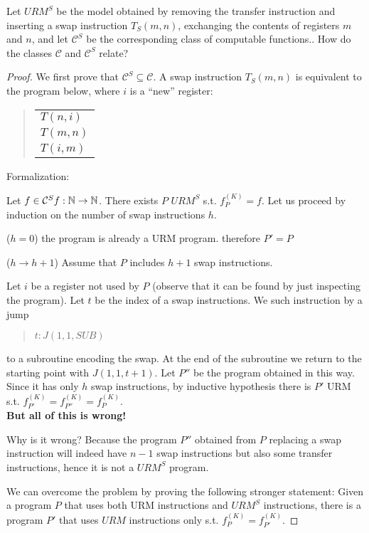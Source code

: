 \begin{exercise}
  Let $URM^S $ be the model obtained by removing the transfer
  instruction and inserting a swap instruction $ T_S(m,n) $,
  exchanging the contents of registers $m$ and $n$, and let $\mathcal{C}^S$ be the corresponding class of computable functions.. How do the classes $\mathcal{C}$ and $\mathcal{C}^S$ relate?

\begin{proof}
  We first prove that $\mathcal{C}^S \subseteq \mathcal{C}$. A swap instruction $T_S (m, n)$ is equivalent to the program below, where $i$ is a ``new'' register:
  \begin{quote}
    \begin{tabular}{l}
    $T(n,i)$ \\
    $T(m,n)$ \\
    $T(i,m)$
    \end{tabular}
    \end{quote}

Formalization:

Let $ f \in \mathcal{C}^S f:\mathbb{N}\rightarrow \mathbb{N} $. There exists $P$
$URM^S $ s.t. $ f_P^{(K)} = f $. Let us proceed by induction on the
number of swap instructions $h$.

($h = 0$) the program is already a URM program. therefore $P' = P$

($h \rightarrow h+1$) Assume that $P$ includes $h+1$ swap instructions. 

Let $i$ be a register not used by $P$ (observe that it can be found by just inspecting the program). Let $t$ be the index of a swap instructions.
We such instruction by a jump
\begin{quote}
  $t : J (1,1, SUB)$
\end{quote}
to a subroutine encoding the swap. At the end of the subroutine we return to the starting point with $J (1,1, t + 1)$. Let $P''$ be the program obtained in this way. Since it has only $h$ swap instructions, by inductive hypothesis there is $P'$ URM s.t. $ f_{P'}^{(K)} = f_{P''}^{(K)} = f_{P}^{(K)}$. \\
\textbf{But all of this is wrong!}

Why is it wrong? Because the program $P''$ obtained from $P$ replacing a swap instruction will indeed have $n-1$ swap instructions but also some transfer instructions, hence it is not a $URM^S$ program.

We can overcome the problem by proving the following stronger
statement: Given a program $P$ that uses both URM instructions and
$URM^S$ instructions, there is a program $P'$ that uses $URM$
instructions only s.t. $ f_{P}^{(K)} = f_{P'}^{(K)} $.


\end{proof}
\end{exercise}
